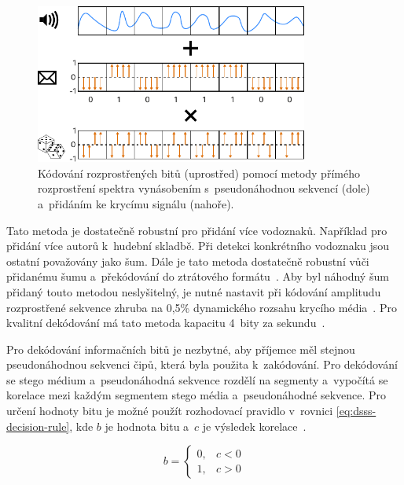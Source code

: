 \begin{figure}[hbt]
    \centering
    \includegraphics[width=0.8\textwidth]{obrazky/direct-sequence-spread-spectrum-diagram.pdf}
    \caption{Kódování rozprostřených bitů (uprostřed) pomocí metody přímého
    rozprostření spektra vynásobením s~pseudonáhodnou sekvencí (dole)
    a~přidáním ke krycímu signálu (nahoře).}
    \label{pic:dsss-spreading}
\end{figure}

Tato metoda je dostatečně robustní pro přidání více vodoznaků. Například pro
přidání více autorů k~hudební skladbě. Při detekci konkrétního vodoznaku jsou
ostatní považovány jako šum. Dále je tato metoda dostatečně robustní vůči
přidanému šumu a~překódování do ztrátového formátu~\cite{Boney1996}. Aby byl
náhodný šum přidaný touto metodou neslyšitelný, je nutné nastavit při kódování
amplitudu rozprostřené sekvence zhruba na 0,5\% dynamického rozsahu krycího
média~\cite{Bender1996}. Pro kvalitní dekódování má tato metoda kapacitu 4~bity
za sekundu~\cite{Bender1996}.

Pro dekódování informačních bitů je nezbytné, aby příjemce měl stejnou
pseudonáhodnou sekvenci čipů, která byla použita k~zakódování. Pro dekódování
se stego médium a~pseudonáhodná sekvence rozdělí na segmenty a~vypočítá se
korelace mezi každým segmentem stego média a~pseudonáhodné sekvence. Pro určení
hodnoty bitu je možné použít rozhodovací pravidlo v~rovnici
\ref{eq:dsss-decision-rule}, kde $b$ je hodnota bitu a~$c$ je výsledek
korelace~\cite{Kuznetsov2022}.

\begin{equation}
    \label{eq:dsss-decision-rule}
    b = \left\{
        \begin{array}{rl}
            0, & c < 0 \\
            1, & c > 0
        \end{array}
    \right.
\end{equation}

